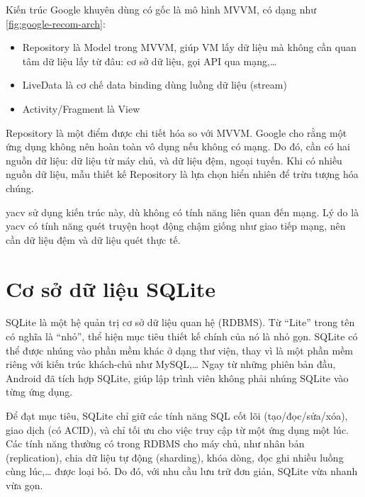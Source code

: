 \documentclass[../../thesis]{subfiles}
\begin{document}
Kiến trúc Google khuyên dùng có gốc là mô hình MVVM, có dạng như
\autoref{fig:google-recom-arch}:

\begin{itemize}
    \item
        Repository là Model trong MVVM, giúp VM lấy dữ liệu mà không cần quan
        tâm dữ liệu lấy từ đâu: cơ sở dữ liệu, gọi API qua mạng,\ldots
    \item
        LiveData là cơ chế data binding dùng luồng dữ liệu (stream)
    \item
        Activity/Fragment là View
\end{itemize}

Repository là một điểm được chi tiết hóa so với MVVM. Google cho rằng một ứng
dụng không nên hoàn toàn vô dụng nếu không có mạng. Do đó, cần có hai nguồn dữ
liệu: dữ liệu từ máy chủ, và dữ liệu đệm, ngoại tuyến. Khi có nhiều nguồn dữ
liệu, mẫu thiết kế Repository là lựa chọn hiển nhiên để trừu tượng hóa chúng.

yacv sử dụng kiến trúc này, dù không có tính năng liên quan đến mạng. Lý do là
yacv có tính năng quét truyện hoạt động chậm giống như giao tiếp mạng, nên cần
dữ liệu đệm và dữ liệu quét thực tế.



\section{Cơ sở dữ liệu SQLite}\label{sec:sqlite}

SQLite là một hệ quản trị cơ sở dữ liệu quan hệ (RDBMS). Từ ``Lite'' trong tên
có nghĩa là ``nhỏ'', thể hiện mục tiêu thiết kế chính của nó là nhỏ gọn. SQLite
có thể được nhúng vào phần mềm khác ở dạng thư viện, thay vì là một phần mềm
riêng với kiến trúc khách-chủ như MySQL,\ldots{} Ngay từ những phiên bản đầu,
Android đã tích hợp SQLite, giúp lập trình viên không phải nhúng SQLite vào từng
ứng dụng.

Để đạt mục tiêu, SQLite chỉ giữ các tính năng SQL cốt lõi (tạo/đọc/sửa/xóa),
giao dịch (có ACID), và chỉ tối ưu cho việc truy cập từ một ứng dụng một lúc.
Các tính năng thường có trong RDBMS cho máy chủ, như nhân bản (replication),
chia dữ liệu tự động (sharding), khóa dòng, đọc ghi nhiều luồng cùng
lúc,\ldots{} được loại bỏ. Do đó, với nhu cầu lưu trữ đơn giản, SQLite vừa nhanh
vừa gọn.
\end{document}
